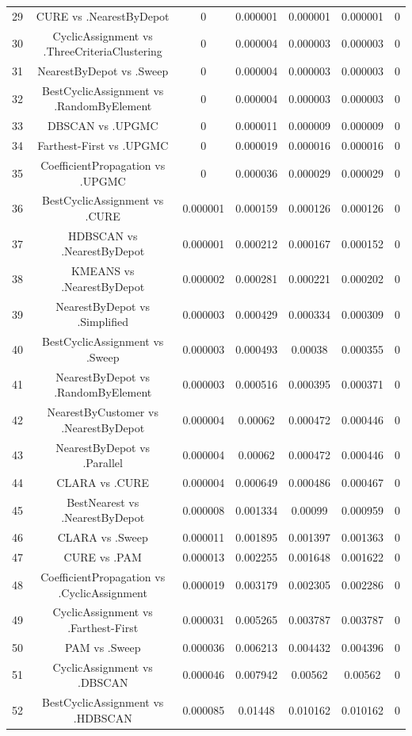 \documentclass[a4paper,10pt]{article}
\begin{document}
\begin{landscape}
\begin{table}[!htp]
\begin{tabular}{ccccccc}
29&CURE vs .NearestByDepot&0&0.000001&0.000001&0.000001&0\\
30&CyclicAssignment vs .ThreeCriteriaClustering&0&0.000004&0.000003&0.000003&0\\
31&NearestByDepot vs .Sweep&0&0.000004&0.000003&0.000003&0\\
32&BestCyclicAssignment vs .RandomByElement&0&0.000004&0.000003&0.000003&0\\
33&DBSCAN vs .UPGMC&0&0.000011&0.000009&0.000009&0\\
34&Farthest-First vs .UPGMC&0&0.000019&0.000016&0.000016&0\\
35&CoefficientPropagation vs .UPGMC&0&0.000036&0.000029&0.000029&0\\
36&BestCyclicAssignment vs .CURE&0.000001&0.000159&0.000126&0.000126&0\\
37&HDBSCAN vs .NearestByDepot&0.000001&0.000212&0.000167&0.000152&0\\
38&KMEANS vs .NearestByDepot&0.000002&0.000281&0.000221&0.000202&0\\
39&NearestByDepot vs .Simplified&0.000003&0.000429&0.000334&0.000309&0\\
40&BestCyclicAssignment vs .Sweep&0.000003&0.000493&0.00038&0.000355&0\\
41&NearestByDepot vs .RandomByElement&0.000003&0.000516&0.000395&0.000371&0\\
42&NearestByCustomer vs .NearestByDepot&0.000004&0.00062&0.000472&0.000446&0\\
43&NearestByDepot vs .Parallel&0.000004&0.00062&0.000472&0.000446&0\\
44&CLARA vs .CURE&0.000004&0.000649&0.000486&0.000467&0\\
45&BestNearest vs .NearestByDepot&0.000008&0.001334&0.00099&0.000959&0\\
46&CLARA vs .Sweep&0.000011&0.001895&0.001397&0.001363&0\\
47&CURE vs .PAM&0.000013&0.002255&0.001648&0.001622&0\\
48&CoefficientPropagation vs .CyclicAssignment&0.000019&0.003179&0.002305&0.002286&0\\
49&CyclicAssignment vs .Farthest-First&0.000031&0.005265&0.003787&0.003787&0\\
50&PAM vs .Sweep&0.000036&0.006213&0.004432&0.004396&0\\
51&CyclicAssignment vs .DBSCAN&0.000046&0.007942&0.00562&0.00562&0\\
52&BestCyclicAssignment vs .HDBSCAN&0.000085&0.01448&0.010162&0.010162&0\\

\end{tabular}
\end{table}
\end{landscape}
\end{document}
